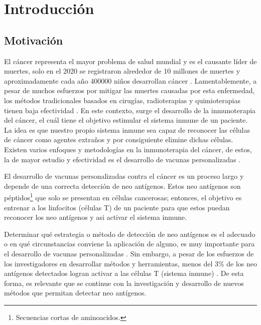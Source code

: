 \chapter{Introducción}
\label{cap:introduccion}


\section{Motivación}
\label{sec:motivacion}
El cáncer representa el mayor problema de salud mundial \citep{siegel2022cancer} y es el causante líder de muertes, solo en el 2020 se registraron alrededor de 10 millones de muertes y aproximadamente cada año 400000 niños desarrollan cáncer \citep{whocancer2022}. Lamentablemente, a pesar de muchos esfuerzos por mitigar las muertes causadas por esta enfermedad, los métodos tradicionales basados en cirugías, radioterapias y quimioterapias tienen baja efectividad \citep{peng2019neoantigen}. En este contexto, surge el desarrollo de la inmunoterapia del cáncer, el cuál tiene el objetivo estimular el sistema inmune de un paciente. La idea es que nuestro propio sistema inmune sea capaz de reconocer las células de cáncer como agentes extraños y por consiguiente elimine dichas células. Existen varios enfoques y metodologías en la inmunoterapia del cáncer, de estos, la de mayor estudio y efectividad es el desarrollo de vacunas personalizadas \citep{borden2022cancer}.

El desarrollo de vacunas personalizadas contra el cáncer es un proceso largo y depende de una correcta detección de neo antígenos. Estos neo antígenos son péptidos\footnote{Secuencias cortas de aminoacidos.} que solo se presentan en células cancerosas; entonces, el objetivo es entrenar a los linfocitos (células T) de un paciente para que estos puedan reconocer los neo antígenos y asi activar el sistema inmune.

Determinar qué estrategia o método de detección de neo antígenos es el adecuado o en qué circunstancias conviene la aplicación de alguno, es muy importante para el desarrollo de vacunas personalizadas \citep{de2020neoantigen, peng2019neoantigen}.  Sin embargo, a pesar de los esfuerzos de los investigadores en desarrollar métodos y herramientas,  menos del 3\% de los neo antígenos detectados logran activar a las células T (sistema inmune) \citep{de2020neoantigen}. De esta forma, es relevante que se continue con la investigación y desarrollo de nuevos métodos que permitan detectar neo antígenos.


